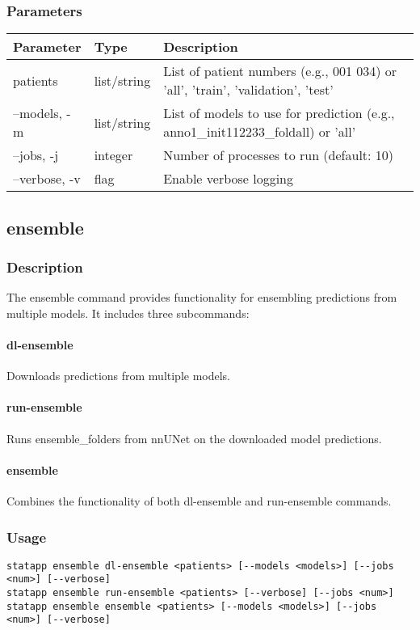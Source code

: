 \documentclass{article}
\begin{document}
\subsubsection{Parameters}
\begin{tabulary}{\linewidth}{LLL}
\toprule
\textbf{Parameter} & \textbf{Type} & \textbf{Description} \\
\midrule
patients & list/string & List of patient numbers (e.g., 001 034) or 'all', 'train', 'validation', 'test' \\
--models, -m & list/string & List of models to use for prediction (e.g., anno1\_init112233\_foldall) or 'all' \\
--jobs, -j & integer & Number of processes to run (default: 10) \\
--verbose, -v & flag & Enable verbose logging \\
\bottomrule
\end{tabulary}

\subsection{ensemble}
\subsubsection{Description}
The ensemble command provides functionality for ensembling predictions from multiple models. It includes three subcommands:

\paragraph{dl-ensemble}
Downloads predictions from multiple models.

\paragraph{run-ensemble}
Runs ensemble\_folders from nnUNet on the downloaded model predictions.

\paragraph{ensemble}
Combines the functionality of both dl-ensemble and run-ensemble commands.

\subsubsection{Usage}
\begin{lstlisting}
statapp ensemble dl-ensemble <patients> [--models <models>] [--jobs <num>] [--verbose]
statapp ensemble run-ensemble <patients> [--verbose] [--jobs <num>]
statapp ensemble ensemble <patients> [--models <models>] [--jobs <num>] [--verbose]
\end{lstlisting}
\end{document}
